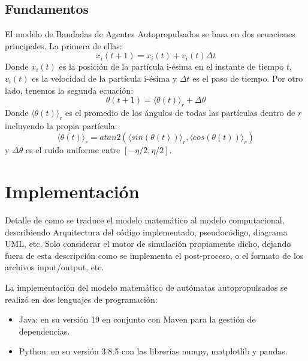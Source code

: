 \documentclass[11pt]{article}
\begin{document}
        \subsection{Fundamentos}

            El modelo de Bandadas de Agentes Autopropulsados se basa en dos ecuaciones principales. La primera de ellas:
            \begin{equation}
                x_i(t+1) = x_i(t) + v_i(t) \Delta t
            \end{equation}
            Donde $x_i(t)$ es la posición de la partícula i-ésima en el instante de tiempo $t$, $v_i(t)$ es la velocidad de la partícula i-ésima
            y $\Delta t$ es el paso de tiempo.
            Por otro lado, tenemos la segunda ecuación:
            \begin{equation}
                \theta(t+1) = \langle \theta(t) \rangle_r+ \Delta \theta
            \end{equation}
            Donde $\langle \theta(t) \rangle_r$ es el promedio de los ángulos de todas las partículas dentro de $r$ incluyendo la propia
            partícula:
            \begin{equation}
                \langle \theta(t) \rangle_r = atan2(\langle sin(\theta(t)) \rangle_r, \langle cos(\theta(t)) \rangle_r)
            \end{equation}
            y $\Delta \theta$ es el ruido uniforme entre $[-\eta/2, \eta/2]$.

    \newpage

    \section{Implementación}
    Detalle de como se traduce el modelo matemático al modelo computacional,
    describiendo Arquitectura del código implementado, pseudocódigo, diagrama UML, etc.
    Solo considerar el motor de simulación propiamente dicho, dejando fuera de esta descripción
    como se implementa el post-proceso, o el formato de los archivos input/output, etc.

    La implementación del modelo matemático de autómatas autopropulsados se realizó en dos lenguajes de programación:
    \begin{itemize}
        \item Java: en su versión 19 en conjunto con Maven para la gestión de dependencias.
        \item Python: en su versión 3.8.5 con las librerías numpy, matplotlib y pandas.
    \end{itemize}
\end{document}
